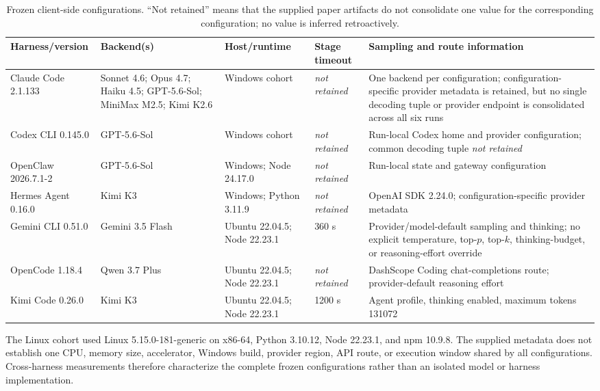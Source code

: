 \documentclass[letterpaper]{article}
\newcommand{\notretained}{\textit{not retained}}
\begin{document}
\begin{table}[t]
\centering
\scriptsize
\setlength{\tabcolsep}{3.3pt}
\begin{tabularx}{\textwidth}{@{}l l l p{} X@{}}
\toprule
Harness/version & Backend(s) & Host/runtime & Stage timeout &
Sampling and route information \\
\midrule
Claude Code 2.1.133 &
Sonnet 4.6; Opus 4.7; Haiku 4.5; GPT-5.6-Sol; MiniMax M2.5; Kimi K2.6 &
Windows cohort & \notretained &
One backend per configuration; configuration-specific provider metadata is
retained, but no single decoding tuple or provider endpoint is consolidated
across all six runs \\
Codex CLI 0.145.0 & GPT-5.6-Sol & Windows cohort & \notretained &
Run-local Codex home and provider configuration; common decoding tuple
\notretained \\
OpenClaw 2026.7.1-2 & GPT-5.6-Sol & Windows; Node 24.17.0 & \notretained &
Run-local state and gateway configuration \\
Hermes Agent 0.16.0 & Kimi K3 & Windows; Python 3.11.9 & \notretained &
OpenAI SDK 2.24.0; configuration-specific provider metadata \\
Gemini CLI 0.51.0 & Gemini 3.5 Flash &
Ubuntu 22.04.5; Node 22.23.1 & 360 s &
Provider/model-default sampling and thinking; no explicit temperature,
top-\(p\), top-\(k\), thinking-budget, or reasoning-effort override \\
OpenCode 1.18.4 & Qwen 3.7 Plus &
Ubuntu 22.04.5; Node 22.23.1 & \notretained &
DashScope Coding chat-completions route; provider-default reasoning effort \\
Kimi Code 0.26.0 & Kimi K3 &
Ubuntu 22.04.5; Node 22.23.1 & 1200 s &
Agent profile, thinking enabled, maximum tokens 131072 \\
\bottomrule
\end{tabularx}
\caption{Frozen client-side configurations.  ``Not retained'' means that the
supplied paper artifacts do not consolidate one value for the corresponding
configuration; no value is inferred retroactively.}
\label{tab:runtime-configurations}
\end{table}

The Linux cohort used Linux 5.15.0-181-generic on x86-64, Python 3.10.12,
Node 22.23.1, and npm 10.9.8.  The supplied metadata does not establish one
CPU, memory size, accelerator, Windows build, provider region, API route, or
execution window shared by all configurations.  Cross-harness measurements
therefore characterize the complete frozen configurations rather than an
isolated model or harness implementation.
\end{document}

